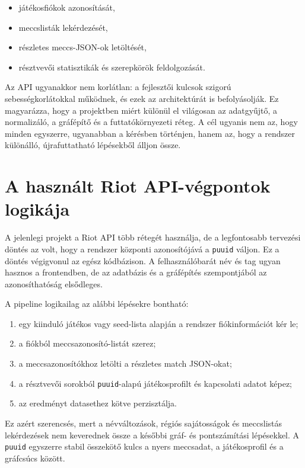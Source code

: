 ﻿\documentclass[a4paper,12pt]{report}
\begin{document}
\begin{itemize}
    \item játékosfiókok azonosítását,
    \item meccslisták lekérdezését,
    \item részletes meccs-JSON-ok letöltését,
    \item résztvevői statisztikák és szerepkörök feldolgozását.
\end{itemize}

Az API ugyanakkor nem korlátlan: a fejlesztői kulcsok szigorú sebességkorlátokkal működnek, és ezek az architektúrát is befolyásolják. Ez magyarázza, hogy a projektben miért különül el világosan az adatgyűjtő, a normalizáló, a gráfépítő és a futtatókörnyezeti réteg. A cél ugyanis nem az, hogy minden egyszerre, ugyanabban a kérésben történjen, hanem az, hogy a rendszer különálló, újrafuttatható lépésekből álljon össze.

\section{A használt Riot API-végpontok logikája}

A jelenlegi projekt a Riot API több rétegét használja, de a legfontosabb tervezési döntés az volt, hogy a rendszer központi azonosítójává a \texttt{puuid} váljon. Ez a döntés végigvonul az egész kódbázison. A felhasználóbarát név és tag ugyan hasznos a frontendben, de az adatbázis és a gráfépítés szempontjából az azonosíthatóság elsődleges.

A pipeline logikailag az alábbi lépésekre bontható:

\begin{enumerate}
    \item egy kiinduló játékos vagy seed-lista alapján a rendszer fiókinformációt kér le;
    \item a fiókból meccsazonosító-listát szerez;
    \item a meccsazonosítókhoz letölti a részletes match JSON-okat;
    \item a résztvevői sorokból \texttt{puuid}-alapú játékosprofilt és kapcsolati adatot képez;
    \item az eredményt datasethez kötve perzisztálja.
\end{enumerate}

Ez azért szerencsés, mert a névváltozások, régiós sajátosságok és meccslistás lekérdezések nem keverednek össze a későbbi gráf- és pontszámítási lépésekkel. A \texttt{puuid} egyszerre stabil összekötő kulcs a nyers meccsadat, a játékosprofil és a gráfcsúcs között.
\end{document}
